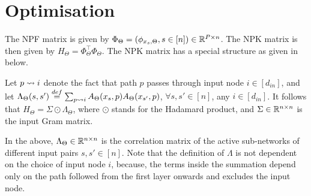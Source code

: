 \section{Optimisation }\label{sec:optimisation}
The NPF matrix is given by $\Phi_{\Theta}=(\phi_{x_s,\Theta},s\in[n])\in\mathbb{R}^{P\times n}$. The NPK matrix is then given by $H_{\Theta}=\Phi^\top_{\Theta}\Phi_{\Theta}$. The NPK matrix has a special structure as given in  below.
\begin{lemma}\label{lm:npk}
Let $p\rightsquigarrow i$ denote the fact that path $p$ passes through input node $i\in[d_{in}]$, and let $\Lambda_{\Theta}(s,s')\stackrel{def}{=}\sum_{p\rightsquigarrow i} A_{\Theta}(x_s,p) A_{\Theta}(x_{s'},p)$, $\forall s,s'\in[n]$, any $i\in [d_{in}]$. It follows that $H_{\Theta}= \Sigma\odot\Lambda_{\Theta}$, where $\odot$ stands for the Hadamard product, and $\Sigma \in \mathbb{R}^{n\times n}$ is the input Gram matrix.
\end{lemma}
In the  above, $\Lambda_{\Theta}\in\mathbb{R}^{n\times n}$ is the correlation matrix of the active sub-networks of different input pairs $s,s'\in[n]$. Note that the definition of $\Lambda$ is not dependent on the choice of input node $i$, because, the terms inside the summation depend only on the path followed from the first layer onwards and excludes the input node.\\
